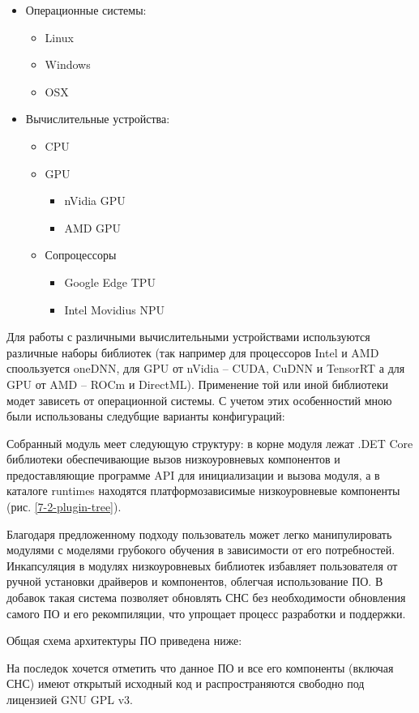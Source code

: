\begin{itemize}
    \item Операционные системы:
    \begin{itemize}
        \item Linux
        \item Windows
        \item OSX
    \end{itemize}
    \item Вычислительные устройства:
    \begin{itemize}
        \item CPU
        \item GPU
        \begin{itemize}
            \item nVidia GPU
            \item AMD GPU
        \end{itemize}
        \item Сопроцессоры
        \begin{itemize}
            \item Google Edge TPU
            \item Intel Movidius NPU
        \end{itemize}
    \end{itemize}
\end{itemize}

Для работы с различными вычислительными устройствами используются различные наборы библиотек (так например для процессоров Intel и AMD споользуется oneDNN, для GPU от nVidia -- CUDA, CuDNN и TensorRT а для GPU от AMD -- ROCm и DirectML). Применение той или иной библиотеки модет зависеть от операционной системы. С учетом этих особенностий мною были использованы следубщие варианты конфигураций:


Собранный модуль меет следующую структуру: в корне модуля лежат .DET Core библиотеки обеспечивающие вызов низкоуровневых компонентов и предоставляющие программе API для инициализации и вызова модуля, а в каталоге runtimes находятся платформозависимые низкоуровневые компоненты (рис. \ref{7-2-plugin-tree}).


Благодаря предложенному подходу пользователь может легко манипулировать модулями с моделями грубокого обучения в зависимости от его потребностей. Инкапсуляция в модулях низкоуровневых библиотек избавляет пользователя от ручной установки драйверов и компонентов, облегчая использование ПО. В добавок такая система позволяет обновлять СНС без необходимости обновления самого ПО и его рекомпиляции, что упрощает процесс разработки и поддержки.

Общая схема архитектуры ПО приведена ниже:


На последок хочется отметить что данное ПО и все его компоненты (включая СНС) имеют открытый исходный код и распространяются свободно под лицензией GNU GPL v3.
